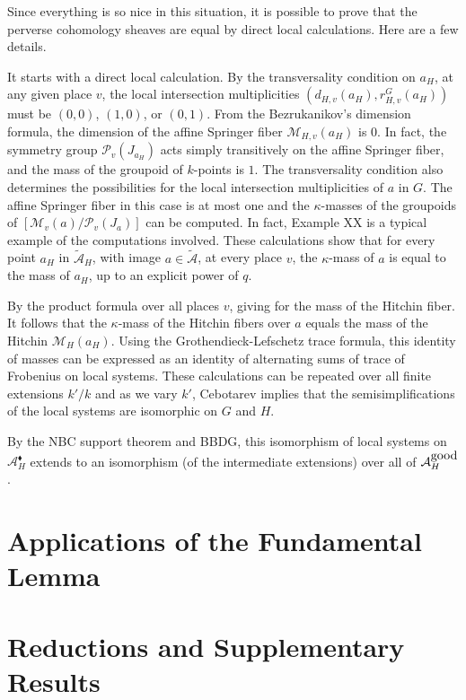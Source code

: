 \documentclass[brochure,english,12pt]{bourbaki}
\def\A{{\mathcal A}}
\def\M{{\mathcal M}}
\def\P{{\mathcal P}}
\def\tA{{\tilde{\mathcal A}}}
\def\diamond{{\blacklozenge}}
\begin{document}
Since everything is so nice in this situation, 
it is possible to prove that the perverse cohomology sheaves
are equal by direct local calculations.  Here are a few details.

It starts with a direct local calculation.  By the transversality
condition on $a_H$, at any given place $v$, the local intersection
multiplicities $(d_{H,v}(a_H),r^G_{H,v}(a_H))$ must be $(0,0)$,
$(1,0)$, or $(0,1)$.  From the Bezrukanikov's dimension formula, the
dimension of the affine Springer fiber $\M_{H,v}(a_H)$ is $0$.  In
fact, the symmetry group $\P_v(J_{a_H})$ acts simply transitively on
the affine Springer fiber, and the mass of the groupoid of $k$-points
is $1$.  The transversality condition also determines the
possibilities for the local intersection multiplicities of $a$ in $G$.
The affine Springer fiber in this case is at most one and the
$\kappa$-masses of the groupoids of $[\M_v(a)/\P_v(J_a)]$ can be
computed.  In fact, Example XX is a typical example of the
computations involved.  These calculations show that for every point
$a_H$ in $\tA_H$, with image $a\in \tA$, at every place $v$, the
$\kappa$-mass of $a$ is equal to the mass of $a_H$, up to an explicit
power of $q$.

By the product formula over all places $v$, giving for the mass of the
Hitchin fiber. It follows that the $\kappa$-mass of the Hitchin fibers
over $a$ equals the mass of the Hitchin $\M_H(a_H)$.  Using the
Grothendieck-Lefschetz trace formula, this identity of masses can be
expressed as an identity of alternating sums of trace of Frobenius on
local systems.  These calculations can be repeated over all finite
extensions $k'/k$ and as we vary $k'$, Cebotarev implies that the
semisimplifications of the local systems are isomorphic on $G$ and
$H$.

By the NBC support theorem and BBDG, 
this isomorphism of local systems on $\A_H^\diamond$ extends
to an isomorphism (of the intermediate extensions) over all of $\A_H^{\hbox{good}}$.







\section{Applications of the Fundamental Lemma}  




\section{Reductions and Supplementary Results}
\end{document}
